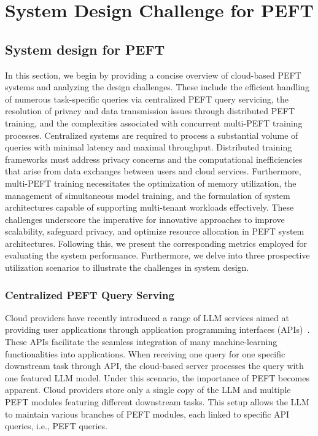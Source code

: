 \section{System Design Challenge for PEFT}
\label{sec:system design}
\subsection{System design for PEFT}
\label{sec:system peft}
In this section, we begin by providing a concise overview of cloud-based PEFT systems and analyzing the design challenges. 
These include the efficient handling of numerous task-specific queries via centralized PEFT query servicing, the resolution of privacy and data transmission issues through distributed PEFT training, and the complexities associated with concurrent multi-PEFT training processes. Centralized systems are required to process a substantial volume of queries with minimal latency and maximal throughput. Distributed training frameworks must address privacy concerns and the computational inefficiencies that arise from data exchanges between users and cloud services. Furthermore, multi-PEFT training necessitates the optimization of memory utilization, the management of simultaneous model training, and the formulation of system architectures capable of supporting multi-tenant workloads effectively. These challenges underscore the imperative for innovative approaches to improve scalability, safeguard privacy, and optimize resource allocation in PEFT system architectures.
Following this, we present the corresponding metrics employed for evaluating the system performance. Furthermore, we delve into three prospective utilization scenarios to illustrate the challenges in system design.

\subsubsection{Centralized PEFT Query Serving} 
Cloud providers have recently introduced a range of LLM services aimed at providing user applications through application programming interfaces (APIs)~\cite{gpt4,gemini}. These APIs facilitate the seamless integration of many machine-learning functionalities into applications.  When receiving one query for one specific downstream task through API, the cloud-based server processes the query with one featured LLM model. Under this scenario, the importance of PEFT becomes apparent. Cloud providers store only a single copy of the LLM and multiple PEFT modules featuring different downstream tasks. This setup allows the LLM to maintain various branches of PEFT modules, each linked to specific API queries, i.e., PEFT queries.

